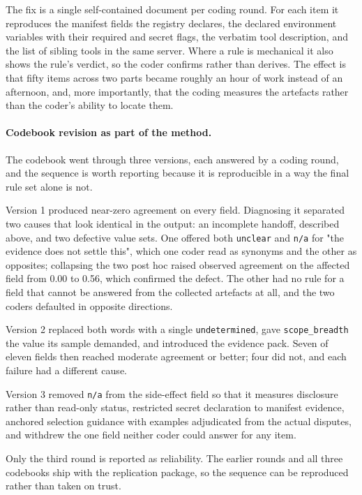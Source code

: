 \documentclass[a4paper,fleqn]{cas-dc}
\begin{document}
The fix is a single self-contained document per coding round. For each item it
reproduces the manifest fields the registry declares, the declared environment
variables with their required and secret flags, the verbatim tool description,
and the list of sibling tools in the same server. Where a rule is mechanical it
also shows the rule's verdict, so the coder confirms rather than derives. The
effect is that fifty items across two parts became roughly an hour of work
instead of an afternoon, and, more importantly, that the coding measures the
artefacts rather than the coder's ability to locate them.

\paragraph{Codebook revision as part of the method.} The codebook went through
three versions, each answered by a coding round, and the sequence is worth
reporting because it is reproducible in a way the final rule set alone is not.

Version 1 produced near-zero agreement on every field. Diagnosing it separated
two causes that look identical in the output: an incomplete handoff, described
above, and two defective value sets. One offered both \texttt{unclear} and
\texttt{n/a} for "the evidence does not settle this", which one coder read as
synonyms and the other as opposites; collapsing the two post hoc raised observed
agreement on the affected field from 0.00 to 0.56, which confirmed the defect.
The other had no rule for a field that cannot be answered from the collected
artefacts at all, and the two coders defaulted in opposite directions.

Version 2 replaced both words with a single \texttt{undetermined}, gave
\texttt{scope\_breadth} the value its sample demanded, and introduced the
evidence pack. Seven of eleven fields then reached moderate agreement or better;
four did not, and each failure had a different cause.

Version 3 removed \texttt{n/a} from the side-effect field so that it measures
disclosure rather than read-only status, restricted secret declaration to
manifest evidence, anchored selection guidance with examples adjudicated from
the actual disputes, and withdrew the one field neither coder could answer for
any item.

Only the third round is reported as reliability. The earlier rounds and all
three codebooks ship with the replication package, so the sequence can be
reproduced rather than taken on trust.
\end{document}

